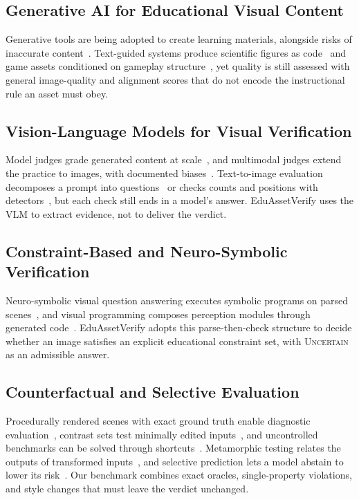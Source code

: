 \documentclass[conference]{IEEEtran}
\newcommand{\Uncertain}{\textsc{Uncertain}}
\begin{document}
\subsection{Generative AI for Educational Visual Content}
Generative tools are being adopted to create learning materials, alongside risks of inaccurate content~\cite{kasneci2023chatgpt}. Text-guided systems produce scientific figures as code~\cite{belouadi2024automatikz} and game assets conditioned on gameplay structure~\cite{anon2026legibility}, yet quality is still assessed with general image-quality and alignment scores that do not encode the instructional rule an asset must obey.

\subsection{Vision-Language Models for Visual Verification}
Model judges grade generated content at scale~\cite{zheng2023judging}, and multimodal judges extend the practice to images, with documented biases~\cite{chen2024mllmjudge}. Text-to-image evaluation decomposes a prompt into questions~\cite{cho2024dsg} or checks counts and positions with detectors~\cite{ghosh2023geneval}, but each check still ends in a model's answer. EduAssetVerify uses the VLM to extract evidence, not to deliver the verdict.

\subsection{Constraint-Based and Neuro-Symbolic Verification}
Neuro-symbolic visual question answering executes symbolic programs on parsed scenes~\cite{yi2018nsvqa}, and visual programming composes perception modules through generated code~\cite{gupta2023visprog,suris2023vipergpt}. EduAssetVerify adopts this parse-then-check structure to decide whether an image satisfies an explicit educational constraint set, with \Uncertain{} as an admissible answer.

\subsection{Counterfactual and Selective Evaluation}
Procedurally rendered scenes with exact ground truth enable diagnostic evaluation~\cite{johnson2017clevr}, contrast sets test minimally edited inputs~\cite{gardner2020contrast}, and uncontrolled benchmarks can be solved through shortcuts~\cite{hsieh2023sugarcrepe}. Metamorphic testing relates the outputs of transformed inputs~\cite{chen2018metamorphic}, and selective prediction lets a model abstain to lower its risk~\cite{geifman2017selective,whitehead2022reliable}. Our benchmark combines exact oracles, single-property violations, and style changes that must leave the verdict unchanged.
\end{document}
